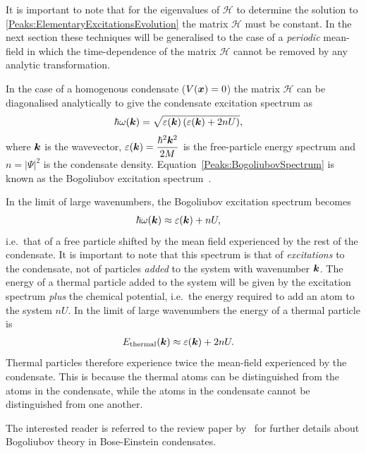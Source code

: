 It is important to note that for the eigenvalues of $\mathcal{H}$ to determine the solution to \eqref{Peaks:ElementaryExcitationsEvolution} the matrix $\mathcal{H}$ must be constant. In the next section these techniques will be generalised to the case of a \emph{periodic} mean-field in which the time-dependence of the matrix $\mathcal{H}$ cannot be removed by any analytic transformation.

In the case of a homogenous condensate ($V(\bm{x}) = 0$) the matrix $\mathcal{H}$ can be diagonalised analytically to give the condensate excitation spectrum as
\begin{align}
    \hbar \omega(\vect{k}) &= \sqrt{\varepsilon(\vect{k})\left(\varepsilon(\vect{k}) + 2 n U \right)},
    \label{Peaks:BogoliubovSpectrum}
\end{align}
where $\bm{k}$ is the wavevector, $\displaystyle \varepsilon(\bm{k}) = \frac{\hbar^2 \bm{k}^2}{2 M}$ is the free-particle energy spectrum and $n = \big|\Psi \big|^2$ is the condensate density. Equation~\eqref{Peaks:BogoliubovSpectrum} is known as the Bogoliubov excitation spectrum~\citep{Bogoliubov:1947}.  

In the limit of large wavenumbers, the Bogoliubov excitation spectrum becomes
\begin{align}
    \hbar \omega(\bm{k}) &\approx \varepsilon(\bm{k}) + n U,
\end{align}
i.e.\ that of a free particle shifted by the mean field experienced by the rest of the condensate.  It is important to note that this spectrum is that of \emph{excitations} to the condensate, not of particles \emph{added} to the system with wavenumber $\bm{k}$.  The energy of a thermal particle added to the system will be given by the excitation spectrum \emph{plus} the chemical potential, i.e.\ the energy required to add an atom to the system $n U$.  In the limit of large wavenumbers the energy of a thermal particle is
\begin{align}
    E_\text{thermal}(\vect{k}) &\approx \varepsilon(\vect{k}) + 2 n U.
    \label{Peaks:ThermalParticleEnergySpectrum}
\end{align}
Thermal particles therefore experience twice the mean-field experienced by the condensate.  This is because the thermal atoms can be distinguished from the atoms in the condensate, while the atoms in the condensate cannot be distinguished from one another.

The interested reader is referred to the review paper by~\citet{Ozeri:2005} for further details about Bogoliubov theory in Bose-Einstein condensates.

